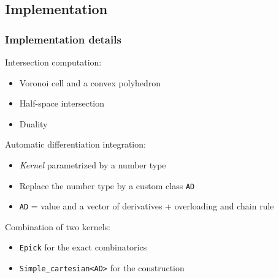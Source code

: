 \documentclass{beamer}
\begin{document}
\subsection{Implementation}
\begin{frame}
    \frametitle{Implementation details}

    Intersection computation:
    \begin{itemize}
        \item Voronoi cell and a convex polyhedron
        \item Half-space intersection
        \item Duality
    \end{itemize}

    Automatic differentiation integration:
    \begin{itemize}
        \item \emph{Kernel} parametrized by a number type
        \item Replace the number type by a custom class \texttt{AD}
        \item \texttt{AD} = value and a vector of derivatives + overloading and
            chain rule
    \end{itemize}

    Combination of two kernels:
    \begin{itemize}
        \item \texttt{Epick} for the exact combinatorics
        \item \texttt{Simple\_cartesian<AD>} for the construction
    \end{itemize}
\end{frame}
\end{document}
